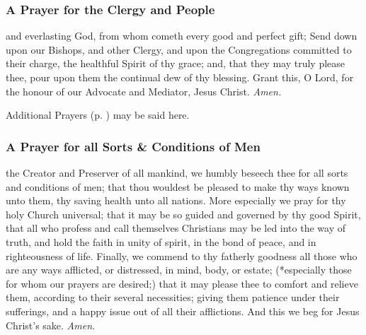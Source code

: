 \subsubsection{A Prayer for the Clergy and People}
 and everlasting God, from whom cometh every good and perfect gift; Send down upon our Bishops, and other Clergy, and upon the Congregations committed to their charge, the healthful Spirit of thy grace; and, that they may truly please thee, pour upon them the continual dew of thy blessing. Grant this, O Lord, for the honour of our Advocate and Mediator, Jesus Christ. \textit{Amen.}
\begin{rubric}
    Additional Prayers (p. \pageref{prayers}) may be said here.
\end{rubric}

\subsubsection{A Prayer for all Sorts \& Conditions of Men}
 the Creator and Preserver of all mankind, we humbly beseech thee for all sorts and conditions of men; that thou wouldest be pleased to make thy ways known unto them, thy saving health unto all nations. More especially we pray for thy holy Church universal; that it may be so guided and governed by thy good Spirit, that all who profess and call themselves Christians may be led into the way of truth, and hold the faith in unity of spirit, in the bond of peace, and in righteousness of life. Finally, we commend to thy fatherly goodness all those who are any ways afflicted, or distressed, in mind, body, or estate; (*especially those for whom our prayers are desired;) that it may please thee to comfort and relieve them, according to their several necessities; giving them patience under their sufferings, and a happy issue out of all their afflictions. And this we beg for Jesus Christ's sake. \textit{Amen.}


